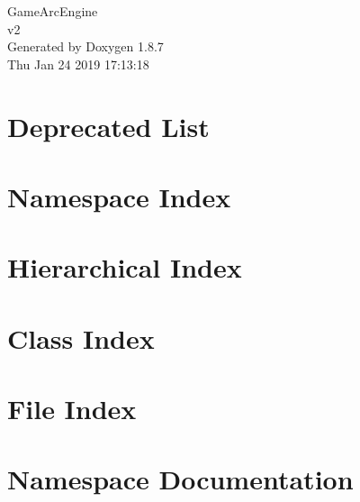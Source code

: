 \documentclass[twoside]{book}
\newcommand{\+}{\discretionary{\mbox{\scriptsize$\hookleftarrow$}}{}{}}
\newcommand{\clearemptydoublepage}{%
  \newpage{\pagestyle{empty}\cleardoublepage}%
}
\begin{document}
\hypersetup{pageanchor=false,
             bookmarks=true,
             bookmarksnumbered=true,
             pdfencoding=unicode
            }
\begin{titlepage}
\vspace*{7cm}
\begin{center}%
{\Large Game\+Arc\+Engine \\[1ex]\large v2 }\\
\vspace*{1cm}
{\large Generated by Doxygen 1.8.7}\\
\vspace*{0.5cm}
{\small Thu Jan 24 2019 17:13:18}\\
\end{center}
\end{titlepage}
\clearemptydoublepage
\tableofcontents
\clearemptydoublepage
{}
\hypersetup{pageanchor=true}

\chapter{Deprecated List}
\label{deprecated}
\hypertarget{deprecated}{}

\chapter{Namespace Index}

\chapter{Hierarchical Index}

\chapter{Class Index}

\chapter{File Index}

\chapter{Namespace Documentation}

\end{document}
